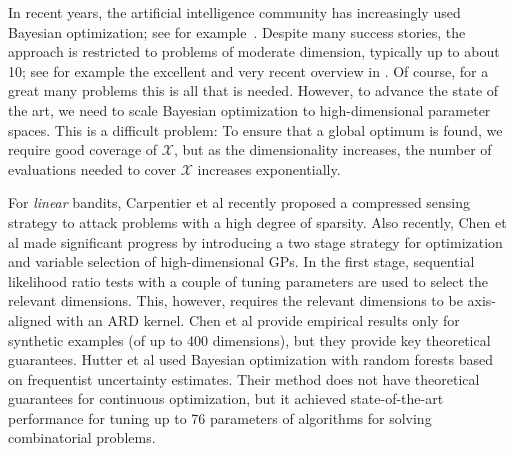 \documentclass{article}
\begin{document}
In recent years, the artificial intelligence community has increasingly used Bayesian optimization;
see for example~\cite{Martinez-Cantin:2009,Brochu:2009,Srinivas:2010,Hoffman:2011,Lizotte:2011,Azimi:2012}. 
Despite many success stories, the approach is restricted to problems of moderate dimension, typically up to about 10; see for example the excellent and very recent overview in \cite{Snoek:2012}. Of course, for a great many problems this is all that is needed. However, to advance the state of the art, we need to scale Bayesian optimization to high-dimensional parameter spaces. 
This is a difficult problem: To ensure that a global optimum is found, we require good coverage of $\mathcal{X}$, but as the dimensionality increases, the number of evaluations needed to cover $\mathcal{X}$ increases exponentially. 

For \emph{linear} bandits, Carpentier et al  recently proposed a compressed sensing strategy to attack problems with a high degree of sparsity. 
Also recently, Chen et al  made significant progress by introducing a two stage strategy for optimization and variable selection of high-dimensional GPs. In the first stage, sequential likelihood ratio tests with a couple of tuning parameters are used to select the relevant dimensions. 
This, however, requires the relevant dimensions to be axis-aligned with an ARD kernel. Chen et al provide empirical results only for synthetic examples (of up to 400 dimensions), but they provide key theoretical guarantees. Hutter et al  used Bayesian optimization with random forests based on frequentist uncertainty estimates. Their method does not have theoretical guarantees for continuous optimization, but it achieved state-of-the-art performance for tuning up to 76 parameters of algorithms for solving combinatorial problems. 
\end{document}
